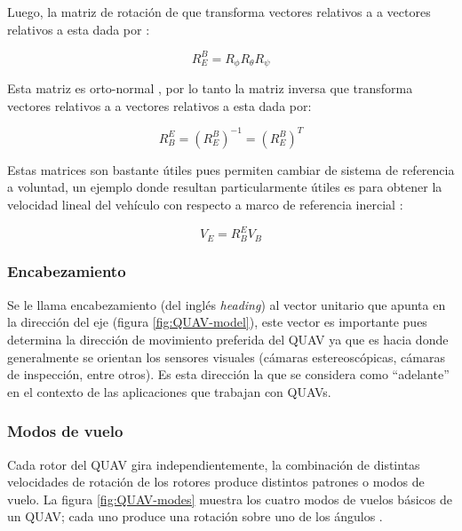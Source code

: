 Luego, la matriz de rotación  de que transforma vectores relativos a  a vectores relativos a  esta dada por \cite{multidrone2015modeling}:


\begin{equation}
    \label{eq:euler-transform}
    R_{E}^{B} = R_{\phi}R_{\theta}R_{\psi}
\end{equation}

Esta matriz es orto-normal \cite{eulerAngles}, por lo tanto la matriz inversa  que transforma vectores relativos a  a vectores relativos a  esta dada por:


\begin{equation}
    \label{eq:euler-transform-2}
    R_{B}^{E} = (R_{E}^{B})^{-1} = (R_{E}^{B})^{T}
\end{equation}

Estas matrices son bastante útiles pues permiten cambiar de sistema de referencia a voluntad, un ejemplo donde resultan particularmente útiles es para obtener la velocidad lineal del vehículo con respecto a marco de referencia inercial :

\begin{equation}
    \label{eq:velocity-world}
    V_{E} = R_{B}^{E} V_{B}
\end{equation}

\subsubsection{Encabezamiento}

Se le llama encabezamiento (del inglés \textit{heading}) al vector unitario que apunta en la dirección del eje  (figura \ref{fig:QUAV-model}), este vector es importante pues determina la dirección de movimiento preferida del QUAV ya que es hacia donde generalmente se orientan los sensores visuales (cámaras estereoscópicas, cámaras de inspección, entre otros). Es esta dirección la que se considera como ``adelante'' en el contexto de las aplicaciones que trabajan con QUAVs.

\subsubsection{Modos de vuelo}

Cada rotor del QUAV gira independientemente, la combinación de distintas velocidades de rotación de los rotores produce distintos patrones o modos de vuelo. La figura \ref{fig:QUAV-modes} muestra los cuatro modos de vuelos básicos de un QUAV; cada uno produce una rotación sobre uno de los ángulos \jim{\phi,\theta,\psi}.

